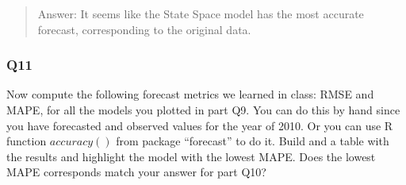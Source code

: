 \documentclass[
]{article}
\newenvironment{Shaded}{\begin{snugshade}}{\end{snugshade}}
\newcommand{\CommentTok}[1]{\textcolor[rgb]{0.56,0.35,0.01}{\textit{#1}}}
\newcommand{\DecValTok}[1]{\textcolor[rgb]{0.00,0.00,0.81}{#1}}
\newcommand{\FunctionTok}[1]{\textcolor[rgb]{0.00,0.00,0.00}{#1}}
\newcommand{\NormalTok}[1]{#1}
\newcommand{\OtherTok}[1]{\textcolor[rgb]{0.56,0.35,0.01}{#1}}
\newcommand{\SpecialCharTok}[1]{\textcolor[rgb]{0.00,0.00,0.00}{#1}}
\newcommand{\StringTok}[1]{\textcolor[rgb]{0.31,0.60,0.02}{#1}}
\begin{document}
\begin{quote}
Answer: It seems like the State Space model has the most accurate
forecast, corresponding to the original data.
\end{quote}

\hypertarget{q11}{%
\subsubsection{Q11}\label{q11}}

Now compute the following forecast metrics we learned in class: RMSE and
MAPE, for all the models you plotted in part Q9. You can do this by hand
since you have forecasted and observed values for the year of 2010. Or
you can use R function \(accuracy()\) from package ``forecast'' to do
it. Build and a table with the results and highlight the model with the
lowest MAPE. Does the lowest MAPE corresponds match your answer for part
Q10?

\begin{Shaded}
\end{Shaded}
\end{document}
